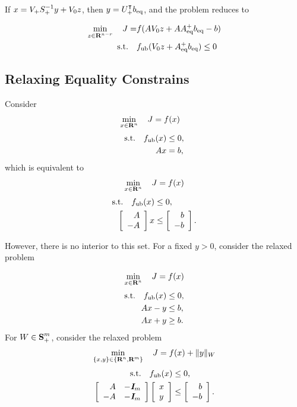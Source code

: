 \documentclass{article}
\begin{document}
    If $x=V_+ S_+^{-1} y + V_0 z$, then $y = U_+^\intercal b_{\text{eq}}$, 
    and the problem reduces to

    \begin{align*}
        \min_{z\in\textbf{R}^{n-r}}\quad J=&f(AV_0 z+AA_{\text{eq}}^+b_{\text{eq}}-b)\\
        \text{s.t.}\quad & f_{\text{ub}}(V_0 z+A_{\text{eq}}^+b_{\text{eq}})\leq 0
    \end{align*}

\subsection{Relaxing Equality Constrains}

    Consider
    \begin{align*}
        \min_{x\in\textbf{R}^{n}}\quad J &= f(x)
    \end{align*}
    \begin{align*}
        \text{s.t.}\quad f_{\text{ub}}(x)&\leq0,\\
        A x&=b,
    \end{align*}
    which is equivalent to
    \begin{align*}
        \min_{x\in\textbf{R}^{n}}\quad J = f(x)
    \end{align*}
    \begin{align*}
        \st\quad f_\ub(x)&\leq0,\\
        \mat{\minus A\\-A} x&\leq\mat{\minus b\\ -b}.
    \end{align*}
    
    However, there is no interior to this set. 
    For a fixed $y>0$, consider the relaxed problem
    
    \begin{align*}
        \min_{x\in\textbf{R}^{n}}\quad J = f(x)
    \end{align*}
    \begin{align*}
        \text{s.t.}\quad f_{\text{ub}}(x)&\leq0,\\
        A x-y&\leq b,\\
        A x+y&\geq b.
    \end{align*}
    For $W\in\textbf{S}_+^m$, consider the relaxed problem
    \begin{align*}
        \min_{\{x,y\}\in\{\textbf{R}^n,\textbf{R}^m\}}\quad J = f(x)+\|y\|_W
    \end{align*}
    \begin{align*}
        \st\quad f_\ub(x)&\leq0,\\
        \mat{\minus A & -\eye_m 
        \\ 
        -A & -\eye_m 
        }\mat{x\\y}
        &\leq
        \mat{\minus b \\ -b}.
    \end{align*}
    
\end{document}

